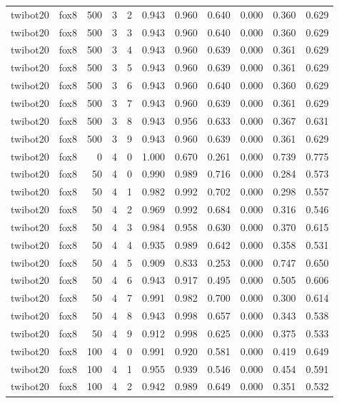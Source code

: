 \begin{tabular}{llrrrrrrrrr}
twibot20 & fox8 & 500 & 3 & 2 & 0.943 & 0.960 & 0.640 & 0.000 & 0.360 & 0.629 \\
twibot20 & fox8 & 500 & 3 & 3 & 0.943 & 0.960 & 0.640 & 0.000 & 0.360 & 0.629 \\
twibot20 & fox8 & 500 & 3 & 4 & 0.943 & 0.960 & 0.639 & 0.000 & 0.361 & 0.629 \\
twibot20 & fox8 & 500 & 3 & 5 & 0.943 & 0.960 & 0.639 & 0.000 & 0.361 & 0.629 \\
twibot20 & fox8 & 500 & 3 & 6 & 0.943 & 0.960 & 0.640 & 0.000 & 0.360 & 0.629 \\
twibot20 & fox8 & 500 & 3 & 7 & 0.943 & 0.960 & 0.639 & 0.000 & 0.361 & 0.629 \\
twibot20 & fox8 & 500 & 3 & 8 & 0.943 & 0.956 & 0.633 & 0.000 & 0.367 & 0.631 \\
twibot20 & fox8 & 500 & 3 & 9 & 0.943 & 0.960 & 0.639 & 0.000 & 0.361 & 0.629 \\
twibot20 & fox8 & 0 & 4 & 0 & 1.000 & 0.670 & 0.261 & 0.000 & 0.739 & 0.775 \\
twibot20 & fox8 & 50 & 4 & 0 & 0.990 & 0.989 & 0.716 & 0.000 & 0.284 & 0.573 \\
twibot20 & fox8 & 50 & 4 & 1 & 0.982 & 0.992 & 0.702 & 0.000 & 0.298 & 0.557 \\
twibot20 & fox8 & 50 & 4 & 2 & 0.969 & 0.992 & 0.684 & 0.000 & 0.316 & 0.546 \\
twibot20 & fox8 & 50 & 4 & 3 & 0.984 & 0.958 & 0.630 & 0.000 & 0.370 & 0.615 \\
twibot20 & fox8 & 50 & 4 & 4 & 0.935 & 0.989 & 0.642 & 0.000 & 0.358 & 0.531 \\
twibot20 & fox8 & 50 & 4 & 5 & 0.909 & 0.833 & 0.253 & 0.000 & 0.747 & 0.650 \\
twibot20 & fox8 & 50 & 4 & 6 & 0.943 & 0.917 & 0.495 & 0.000 & 0.505 & 0.606 \\
twibot20 & fox8 & 50 & 4 & 7 & 0.991 & 0.982 & 0.700 & 0.000 & 0.300 & 0.614 \\
twibot20 & fox8 & 50 & 4 & 8 & 0.943 & 0.998 & 0.657 & 0.000 & 0.343 & 0.538 \\
twibot20 & fox8 & 50 & 4 & 9 & 0.912 & 0.998 & 0.625 & 0.000 & 0.375 & 0.533 \\
twibot20 & fox8 & 100 & 4 & 0 & 0.991 & 0.920 & 0.581 & 0.000 & 0.419 & 0.649 \\
twibot20 & fox8 & 100 & 4 & 1 & 0.955 & 0.939 & 0.546 & 0.000 & 0.454 & 0.591 \\
twibot20 & fox8 & 100 & 4 & 2 & 0.942 & 0.989 & 0.649 & 0.000 & 0.351 & 0.532 \\

\end{tabular}
